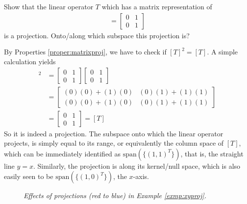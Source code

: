 \begin{exmp}
\label{exmp:xyproj}
Show that the linear operator $T$ which has a matrix representation of
\begin{align*}
[T] =
\begin{bmatrix}
0 & 1 \\
0 & 1 
\end{bmatrix}
\end{align*}
is a projection. Onto/along which subspace this projection is? 
\end{exmp}
\begin{solution}
By Properties \ref{proper:matrixproj}, we have to check if $[T]^2 = [T]$. A simple calculation yields
\begin{align*}
[T]^2 &=
\begin{bmatrix}
0 & 1 \\
0 & 1 
\end{bmatrix}
\begin{bmatrix}
0 & 1 \\
0 & 1 
\end{bmatrix} \\
&= 
\begin{bmatrix}
(0)(0) + (1)(0) & (0)(1) + (1)(1) \\
(0)(0) + (1)(0) & (0)(1) + (1)(1)
\end{bmatrix} \\
&= 
\begin{bmatrix}
0 & 1 \\
0 & 1 
\end{bmatrix} = [T]
\end{align*}
So it is indeed a projection. The subspace onto which the linear operator projects, is simply equal to its range, or equivalently the column space of $[T]$, which can be immediately identified as $\text{span}(\{(1,1)^T\})$, that is, the straight line $y=x$. Similarly, the projection is along its kernel/null space, which is also easily seen to be $\text{span}(\{(1,0)^T\})$, the $x$-axis.\par
\end{solution}

\begin{figure}[h!]
    \centering
    \caption{\textit{Effects of projections (red to blue) in Example \ref{exmp:xyproj}.}}
\end{figure}

